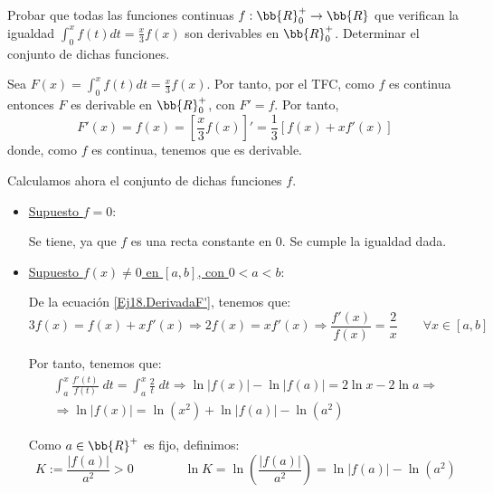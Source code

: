 \begin{ejercicio}
    Probar que todas las funciones continuas $f:\bb{R}_0^+ \to \bb{R}$ que verifican la igualdad $\int_0^x f(t)dt = \frac{x}{3}f(x)$ son derivables en $\bb{R}_0^+$. Determinar el conjunto de dichas funciones.

    Sea $F(x)=\int_0^x f(t)dt = \frac{x}{3}f(x)$. Por tanto, por el TFC, como $f$ es continua entonces $F$ es derivable en $\bb{R}^+_0$, con $F'=f$. Por tanto,
    \begin{equation}\label{Ej18.DerivadaF'}
        F'(x)=f(x) = \left[\frac{x}{3}f(x)\right]' = \frac{1}{3}[f(x)+xf'(x)]
    \end{equation}
    donde, como $f$ es continua, tenemos que es derivable.

    \vspace{1cm}Calculamos ahora el conjunto de dichas funciones $f$.

    \begin{itemize}
        \item \underline{Supuesto $f = 0$}:
        
        Se tiene, ya que $f$ es una recta constante en 0. Se cumple la igualdad dada.

        \item \underline{Supuesto $f(x) \neq 0$ en $[a,b]$, con $0<a<b$}:
    
        De la ecuación \ref{Ej18.DerivadaF'}, tenemos que:
        \begin{equation*}
            3f(x)=f(x)+xf'(x) \Longrightarrow 2f(x)=xf'(x)
            \Longrightarrow
            \frac{f'(x)}{f(x)} = \frac{2}{x} \qquad \forall x\in [a,b]
        \end{equation*}

        Por tanto, tenemos que:
        \begin{multline*}
            \int_a^x \frac{f'(t)}{f(t)}\;dt
            = \int_a^x \frac{2}{t}\;dt
            \Longrightarrow \ln |f(x)| - \ln|f(a)| = 2\ln x - 2\ln a
            \Longrightarrow \\ \Longrightarrow
            \ln|f(x)| = \ln(x^2) +\ln|f(a)| -\ln(a^2)
        \end{multline*}

        Como $a\in \bb{R}^+$ es fijo, definimos:
        \begin{equation*}
            K:=\frac{|f(a)|}{a^2}>0 \qquad \qquad
            \ln K = \ln \left(\frac{|f(a)|}{a^2}\right) = \ln |f(a)|-\ln(a^2)
        \end{equation*}


\end{itemize}
\end{ejercicio}
